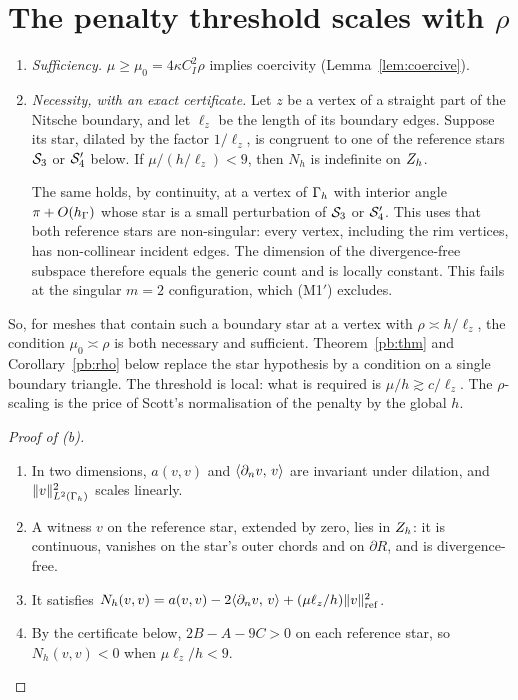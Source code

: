 \section{The penalty threshold scales with \texorpdfstring{$\rho$}{rho}}\label{sec:penalty}

\begin{proposition}\label{prop:penalty}\leavevmode
\begin{enumerate}[label=(\alph*)]
\item \emph{Sufficiency.} $\mu\ge\mu_0=4\kappa C_I^2\rho$ implies coercivity (Lemma~\ref{lem:coercive}).
\item \emph{Necessity, with an exact certificate.} Let $z$ be a vertex of a straight part of the Nitsche boundary, and let $\ell_z$ be the length of its boundary edges. Suppose its star, dilated by the factor $1/\ell_z$, is congruent to one of the reference stars $\mathcal S_3$ or $\mathcal S_4'$ below. If $\mu/(h/\ell_z)<9$, then $N_h$ is indefinite on $Z_h$.

The same holds, by continuity, at a vertex of $\Gamma_h$ with interior angle $\pi+O(h_\Gamma)$ whose star is a small perturbation of $\mathcal S_3$ or $\mathcal S_4'$. This uses that both reference stars are non-singular: every vertex, including the rim vertices, has non-collinear incident edges. The dimension of the divergence-free subspace therefore equals the generic count and is locally constant. This fails at the singular $m=2$ configuration, which (M1$'$) excludes.
\end{enumerate}
\end{proposition}

So, for meshes that contain such a boundary star at a vertex with $\rho\asymp h/\ell_z$, the condition $\mu_0\asymp\rho$ is both necessary and sufficient. Theorem~\ref{pb:thm} and Corollary~\ref{pb:rho} below replace the star hypothesis by a condition on a single boundary triangle. The threshold is local: what is required is $\mu/h\gtrsim c/\ell_z$. The $\rho$-scaling is the price of Scott's normalisation of the penalty by the global $h$.

\begin{proof}[Proof of (b)]
\begin{enumerate}
\item In two dimensions, $a(v,v)$ and $\langle \partial_n v,\, v\rangle$ are invariant under dilation, and $\lVert v\rVert^2_{L^2(\Gamma_h)}$ scales linearly.
\item A witness $v$ on the reference star, extended by zero, lies in $Z_h$: it is continuous, vanishes on the star's outer chords and on $\partial R$, and is divergence-free.
\item It satisfies $N_h(v,v)=a(v,v)-2\langle \partial_n v,\, v\rangle+(\mu\ell_z/h)\lVert v\rVert^2_{\mathrm{ref}}$.
\item By the certificate below, $2B-A-9C>0$ on each reference star, so $N_h(v,v)<0$ when $\mu\ell_z/h<9$.\qedhere
\end{enumerate}
\end{proof}

